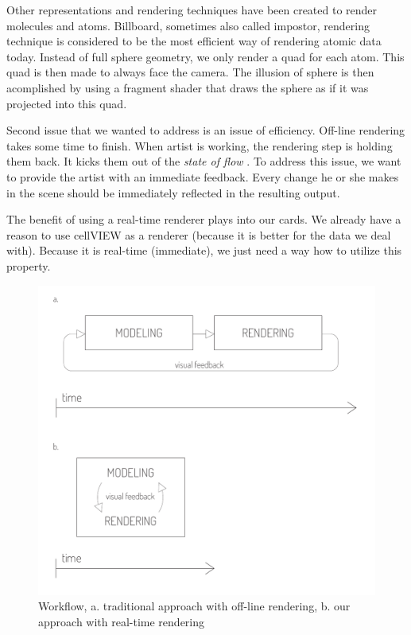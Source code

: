 \documentclass[
  digital, %
  table,   %
  nolof,     %
  nolot,     %
  oneside,
]{fithesis3}
\begin{document}
Other representations and rendering techniques have been created to render molecules and atoms. Billboard, sometimes also called impostor, rendering technique is considered to be the most efficient way of rendering atomic data today. Instead of full sphere geometry, we only render a quad for each atom. This quad is then made to always face the camera. The illusion of sphere is then acomplished by using a fragment shader that draws the sphere as if it was projected into this quad.

Second issue that we wanted to address is an issue of efficiency. Off-line rendering takes some time to finish. When artist is working, the rendering step is holding them back. It kicks them out of the \textit{state of flow} \cite{FlowTheoryandResearch}. To address this issue, we want to provide the artist with an immediate feedback. Every change he or she makes in the scene should be immediately reflected in the resulting output.

The benefit of using a real-time renderer plays into our cards. We already have a reason to use cellVIEW as a renderer (because it is better for the data we deal with). Because it is real-time (immediate), we just need a way how to utilize this property.

\begin{figure}
  \centering
  \includegraphics[scale=0.8]{images/workflow-before-after.pdf}
  \caption{Workflow, a. traditional approach with off-line rendering, b. our approach with real-time rendering}
  \label{fig:workflow-before-after}
\end{figure}
\end{document}
